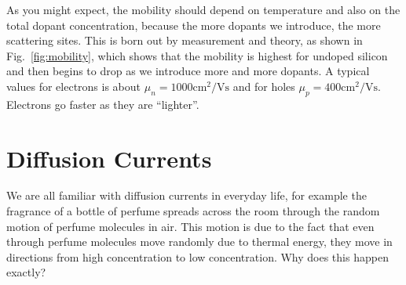 As you might expect, the mobility should depend on temperature and also on the total dopant concentration, because the more dopants we introduce, the more scattering sites.  This is born out by measurement and theory, as shown in Fig.~\ref{fig:mobility}, which shows that the mobility is highest for undoped silicon and then begins to drop as we introduce more and more dopants.  A typical values for electrons is about ${\mu _n} = 1000 \mathrm{cm^2}/\mathrm{V s}$ and for holes ${\mu _p} = 400 \mathrm{cm^2}/\mathrm{V s}$.  Electrons go faster as they are “lighter”. 
\section{Diffusion Currents}
We are all familiar with diffusion currents in everyday life, for example the fragrance of a bottle of perfume spreads across the room through the random motion of perfume molecules in air.   This motion is due to the fact that even through perfume molecules move randomly due to thermal energy, they move in directions from high concentration to low concentration.  Why does this happen exactly?
